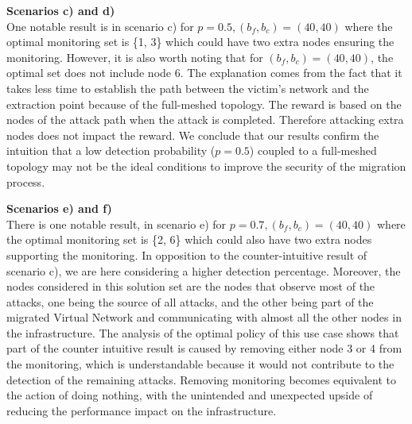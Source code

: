 \textbf{Scenarios c) and d)\\}
One notable result is in scenario c) for $p=0.5,  (b_f,b_c) = (40,40)$ where the optimal monitoring set is \{1, 3\} which could have two extra nodes ensuring the monitoring. However, it is also worth noting that for $(b_f,b_c)=(40,40)$, the optimal set does not include node 6. The explanation comes from the fact that it takes less time to establish the path between the victim's network and the extraction point because of the full-meshed topology. The reward is based on the nodes of the attack path when the attack is completed. Therefore attacking extra nodes does not impact the reward. We conclude that our results confirm the intuition that a low detection probability ($p=0.5$) coupled to a full-meshed topology may not be the ideal conditions to improve the security of the migration process. 


\textbf{Scenarios e) and f)}\\
There is one notable result, in scenario e) for $p=0.7,  (b_f,b_c) = (40,40)$ where the optimal monitoring set is \{2, 6\} which could also have two extra nodes supporting the monitoring. In opposition to the counter-intuitive result of scenario c), we are here considering a higher detection percentage. Moreover, the nodes considered in this solution set are the nodes that observe most of the attacks, one being the source of all attacks, and the other being part of the migrated Virtual Network and communicating with almost all the other nodes in the infrastructure. The analysis of the optimal policy of this use case shows that part of the counter intuitive result is caused by removing either node 3 or 4 from the monitoring, which is understandable because it would not contribute to the detection of the remaining attacks. Removing monitoring becomes equivalent to the action of doing nothing, with the unintended and unexpected upside of reducing the performance impact on the infrastructure.


